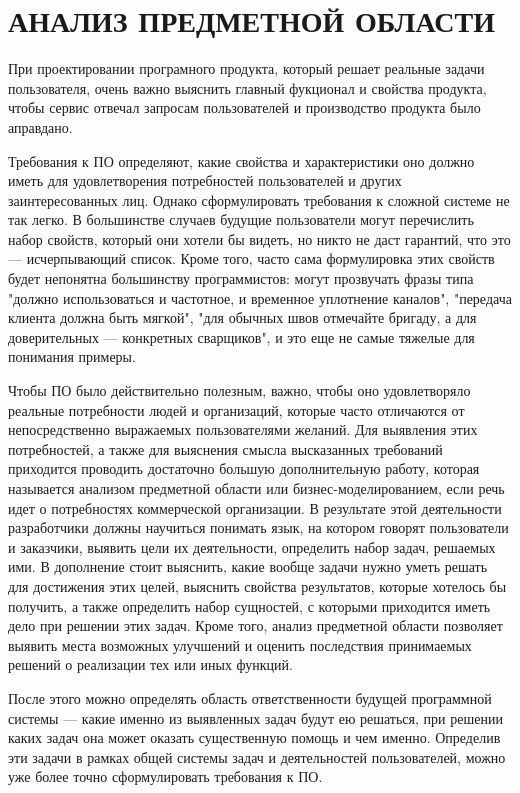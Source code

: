 \section{АНАЛИЗ ПРЕДМЕТНОЙ ОБЛАСТИ}
\label{sec:analysis}

При проектировании програмного продукта, который решает реальные задачи пользователя, очень важно выяснить главный фукционал и свойства продукта, чтобы сервис отвечал запросам пользователей и производство продукта было аправдано.

Требования к ПО определяют, какие свойства и характеристики оно должно иметь для удовлетворения потребностей пользователей и других заинтересованных лиц. Однако сформулировать требования к сложной системе не так легко. В большинстве случаев будущие пользователи могут перечислить набор свойств, который они хотели бы видеть, но никто не даст гарантий, что это — исчерпывающий список. Кроме того, часто сама формулировка этих свойств будет непонятна большинству программистов: могут прозвучать фразы типа "должно использоваться и частотное, и временное уплотнение каналов", "передача клиента должна быть мягкой", "для обычных швов отмечайте бригаду, а для доверительных — конкретных сварщиков", и это еще не самые тяжелые для понимания примеры.

Чтобы ПО было действительно полезным, важно, чтобы оно удовлетворяло реальные потребности людей и организаций, которые часто отличаются от непосредственно выражаемых пользователями желаний. Для выявления этих потребностей, а также для выяснения смысла высказанных требований приходится проводить достаточно большую дополнительную работу, которая называется анализом предметной области или бизнес-моделированием, если речь идет о потребностях коммерческой организации. В результате этой деятельности разработчики должны научиться понимать язык, на котором говорят пользователи и заказчики, выявить цели их деятельности, определить набор задач, решаемых ими. В дополнение стоит выяснить, какие вообще задачи нужно уметь решать для достижения этих целей, выяснить свойства результатов, которые хотелось бы получить, а также определить набор сущностей, с которыми приходится иметь дело при решении этих задач. Кроме того, анализ предметной области позволяет выявить места возможных улучшений и оценить последствия принимаемых решений о реализации тех или иных функций.

После этого можно определять область ответственности будущей программной системы — какие именно из выявленных задач будут ею решаться, при решении каких задач она может оказать существенную помощь и чем именно. Определив эти задачи в рамках общей системы задач и деятельностей пользователей, можно уже более точно сформулировать требования к ПО.

